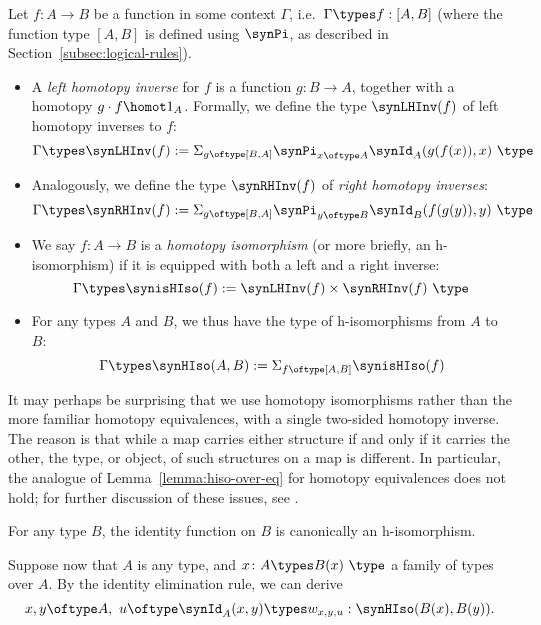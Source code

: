 \begin{definition}[Joyal] \label{def:hiso} Let $f \colon A \to B$ be a function in some context $\Gamma$, i.e.\ $\Gamma\types f : [A,B]$ (where the function type $[A,B]$ is defined using $\synPi$, as described in Section~\ref{subsec:logical-rules}).
\begin{itemize}
\item A \emph{left homotopy inverse} for $f$ is a function $g \colon B \to A$, together with a homotopy $g \cdot f \homot 1_A$.  Formally, we define the type $\synLHInv(f)$ of left homotopy inverses to $f$:
\[ \Gamma \types \synLHInv(f) := \Sigma_{g \oftype [B,A]} \synPi_{x \oftype A} \synId_A(g(f(x)),x)\ \type \]

\item Analogously, we define the type $\synRHInv(f)$ of \emph{right homotopy inverses}:
\[ \Gamma \types \synRHInv(f) := \Sigma_{g \oftype [B,A]} \synPi_{y \oftype B} \synId_B(f(g(y)),y)\ \type \]

\item We say $f \colon A \to B$ is a \emph{homotopy isomorphism} (or more briefly, an h-isomorphism) if it is equipped with both a left and a right inverse:
\[ \Gamma \types \synisHIso(f) := \synLHInv(f) \times \synRHInv(f) \ \type \]

\item For any types $A$ and $B$, we thus have the type of h-isomorphisms from $A$ to $B$:
\[ \Gamma \types \synHIso(A,B) := \Sigma_{f \oftype [A,B]} \synisHIso(f) \]
\end{itemize}
\end{definition}

It may perhaps be surprising that we use homotopy isomorphisms rather than the more familiar homotopy equivalences, with a single two-sided homotopy inverse.  The reason is that while a map carries either structure if and only if it carries the other, the type, or object, of such structures on a map is different.  In particular, the analogue of Lemma~\ref{lemma:hiso-over-eq} for homotopy equivalences does not hold; for further discussion of these issues, see \cite[Ch.~4]{hott:book}.

\begin{example}
For any type $B$, the identity function on $B$ is canonically an h-isomorphism.
\end{example}

Suppose now that $A$ is any type, and $x \colon A \types B(x)\ \type$ a family of types over $A$.  By the identity elimination rule, we can derive
\[ x,y \oftype A,\ u \oftype \synId_A(x,y) \types w_{x,y,u} : \synHIso(B(x),B(y)). \]

